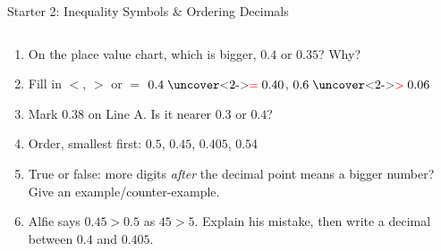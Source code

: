 \documentclass{beamer}
\newcommand{\ashow}[1]{\uncover<2->{\textcolor{red}{\small #1}}}
\begin{document}
\begin{frame}{Starter 2: Inequality Symbols \& Ordering Decimals}
\begin{columns}[T]
\begin{multicols}{2}
\begin{enumerate}
  \item On the place value chart, which is bigger, $0.4$ or $0.35$? Why? \ashow{$0.4$: $4$ tenths is greater than $3$ tenths}

  \item Fill in $<$, $>$ or $=$ $0.4 \mathrel{\text{\ashow{$=$}}} 0.40$, $0.6 \mathrel{\text{\ashow{$>$}}} 0.06$

\vspace{0.5em}

  \item Mark $0.38$ on Line A. Is it nearer $0.3$ or $0.4$? \ashow{nearer $0.4$}

  \columnbreak

  \item Order, smallest first: $0.5$, $0.45$, $0.405$, $0.54$ \ashow{$0.405$, $0.45$, $0.5$, $0.54$}

  \vspace{0.2em}

  \item True or false: more digits \emph{after} the decimal point means a bigger number? Give an example/counter-example. \ashow{False: $0.9>0.1234$}

  \vspace{0.2em}

  \item Alfie says $0.45>0.5$ as $45>5$. Explain his mistake, then write a decimal between $0.4$ and $0.405$. \ashow{$0.5$ has $5$ tenths; e.g.\ $0.402$}

\end{enumerate}
\end{multicols}

\end{columns}

\end{frame}
\end{document}
